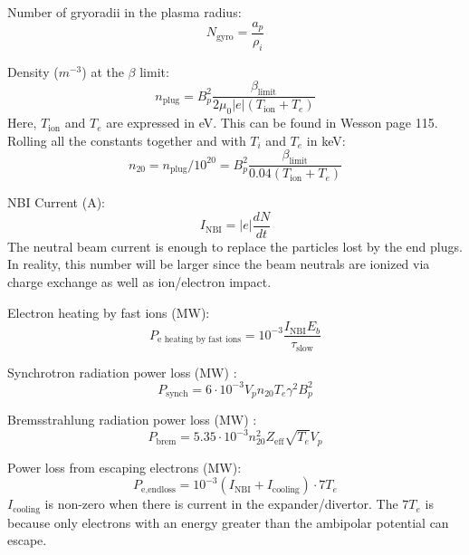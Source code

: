 Number of gryoradii in the plasma radius:
\begin{equation}
    N_{\text{gyro}} = \frac{a_p}{\rho_i}
\end{equation}

Density ($m^{-3}$) at the $\beta$ limit:
\begin{equation}
    n_{\text{plug}} = B_p^2 \frac{\beta_{\text{limit}}}{2\mu_0 |e| \left(T_{\text{ion}} + T_e \right)}
\end{equation}
Here, $T_{\text{ion}}$ and $T_e$ are expressed in eV. This can be found in Wesson page 115. Rolling all the constants together and with $T_i$ and $T_e$ in keV:
\begin{equation}
    n_{20}=n_{\text{plug}} / 10^{20} = B_p^2 \frac{\beta_{\text{limit}}}{0.04 \left(T_{\text{ion}} + T_e \right)}
\end{equation}

NBI Current (A): 
\begin{equation}
    I_{\text{NBI}}=|e|\frac{dN}{dt}
\end{equation}
The neutral beam current is enough to replace the particles lost by the end plugs. In reality, this number will be larger since the beam neutrals are ionized via charge exchange as well as ion/electron impact.

Electron heating by fast ions (MW):
\begin{equation}
    P_{\text{e heating by fast ions}} = 10^{-3}\frac{I_{\text{NBI}}E_b}{\tau_{\text{slow}}}
\end{equation}

Synchrotron radiation power loss (MW) \cite{wesson_1987_419}:
\begin{equation}
    P_{\text{synch}} = 6\cdot10^{-3} V_p n_{20} T_e \gamma^2 B_p^2
\end{equation}

Bremsstrahlung radiation power loss (MW) \cite{wesson_1987_419}:
\begin{equation}
    P_{\text{brem}} = 5.35\cdot10^{-3} n_{20}^2 Z_{\text{eff}}\sqrt{T_e} V_p
\end{equation}

Power loss from escaping electrons (MW):
\begin{equation}
    P_{\text{e,endloss}} = 10^{-3}(I_{\text{NBI}}+I_{\text{cooling}})\cdot 7 T_e
\end{equation}
$I_{\text{cooling}}$ is non-zero when there is current in the expander/divertor. The $7T_e$ is because only electrons with an energy greater than the ambipolar potential can escape.

